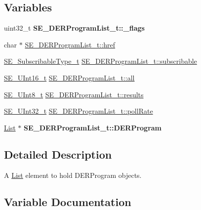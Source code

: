 \subsection*{Variables}
\begin{DoxyCompactItemize}
\item 
\mbox{\label{group__DERProgramList_ga7892f6b7f4bcbd39d187ddfafa12d0fd}} 
uint32\+\_\+t {\bfseries S\+E\+\_\+\+D\+E\+R\+Program\+List\+\_\+t\+::\+\_\+flags}
\item 
char $\ast$ \hyperlink{group__DERProgramList_gad8fa23267d2231b0402935da3ac7ef59}{S\+E\+\_\+\+D\+E\+R\+Program\+List\+\_\+t\+::href}
\item 
\hyperlink{group__SubscribableType_ga5c41f553d369710ed34619266bf2551e}{S\+E\+\_\+\+Subscribable\+Type\+\_\+t} \hyperlink{group__DERProgramList_gac3b255db4914973bb3d51e1b104ca485}{S\+E\+\_\+\+D\+E\+R\+Program\+List\+\_\+t\+::subscribable}
\item 
\hyperlink{group__UInt16_gac68d541f189538bfd30cfaa712d20d29}{S\+E\+\_\+\+U\+Int16\+\_\+t} \hyperlink{group__DERProgramList_ga2d6ff72e19fafdcdceed6255c9770524}{S\+E\+\_\+\+D\+E\+R\+Program\+List\+\_\+t\+::all}
\item 
\hyperlink{group__UInt8_gaf7c365a1acfe204e3a67c16ed44572f5}{S\+E\+\_\+\+U\+Int8\+\_\+t} \hyperlink{group__DERProgramList_gaef78d7616581dd0227f68b61f00a2c02}{S\+E\+\_\+\+D\+E\+R\+Program\+List\+\_\+t\+::results}
\item 
\hyperlink{group__UInt32_ga70bd4ecda3c0c85d20779d685a270cdb}{S\+E\+\_\+\+U\+Int32\+\_\+t} \hyperlink{group__DERProgramList_gaad6d0952e709c97938d369ddb2da093f}{S\+E\+\_\+\+D\+E\+R\+Program\+List\+\_\+t\+::poll\+Rate}
\item 
\mbox{\label{group__DERProgramList_gac44a82181bcf6bd86759744bb4867f65}} 
\hyperlink{structList}{List} $\ast$ {\bfseries S\+E\+\_\+\+D\+E\+R\+Program\+List\+\_\+t\+::\+D\+E\+R\+Program}
\end{DoxyCompactItemize}


\subsection{Detailed Description}
A \hyperlink{structList}{List} element to hold D\+E\+R\+Program objects. 

\subsection{Variable Documentation}
\mbox{\label{group__DERProgramList_ga2d6ff72e19fafdcdceed6255c9770524}} 
